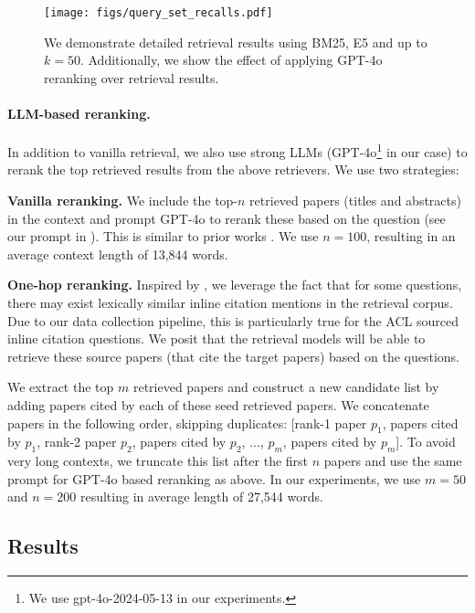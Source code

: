 \begin{figure*}[ht]
    \centering
    \texttt{[image: figs/query\_set\_recalls.pdf]}
    \caption{We demonstrate detailed retrieval results using BM25, E5 and \grit{} up to $k=50$. Additionally, we show the effect of applying GPT-4o reranking over \grit{} retrieval results.
    } 
    \label{fig:query_set_recalls}
\end{figure*}

\paragraph{LLM-based reranking.}
In addition to vanilla retrieval, we also use strong LLMs (GPT-4o\footnote{We use gpt-4o-2024-05-13 in our experiments.} in our case) to rerank the top retrieved results from the above retrievers. We use two strategies:

 \textbf{Vanilla reranking.} We include the top-$n$ retrieved papers (titles and abstracts) in the context and prompt GPT-4o to rerank these based on the question (see our prompt in ). This is similar to prior works \citep{sun-etal-2023-chatgpt,ma2023zero}. We use $n=100$, resulting in an average context length of 13,844 words. 

\textbf{One-hop reranking.} Inspired by \citet{tang2023referral}, we leverage the fact that for some questions, there may exist lexically similar inline citation mentions in the retrieval corpus. Due to our data collection pipeline, this is particularly true for the ACL sourced inline citation questions. 
We posit that the retrieval models  will be able to retrieve these source papers (that cite the target papers) based on the questions. 

We extract the top $m$ retrieved papers and construct a new candidate list by adding papers cited by each of these seed retrieved papers. We concatenate papers in the following order, skipping duplicates: [rank-1 paper $p_1$, papers cited by $p_1$, rank-2 paper $p_2$, papers cited by $p_2$, ..., $p_m$, papers cited by $p_m$].
To avoid very long contexts, we truncate this list after the first $n$ papers and use the same prompt for GPT-4o based reranking as above. In our experiments, we use $m=50$ and $n=200$ resulting in average length of 27,544 words.

\subsection{Results}
\label{sec:main_result}


